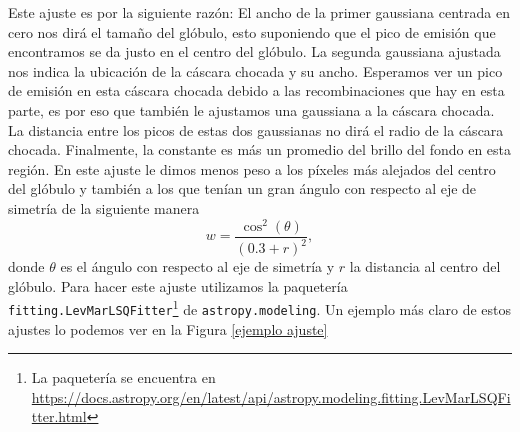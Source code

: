 \documentclass{book}
\begin{document}
Este ajuste es por la siguiente razón: El ancho de la primer gaussiana
centrada en cero nos dirá el tamaño del glóbulo, esto suponiendo que
el pico de emisión que encontramos se da justo en el centro del
glóbulo. La segunda gaussiana ajustada nos indica la ubicación de la
cáscara chocada y su ancho. Esperamos ver un pico de emisión en esta
cáscara chocada debido a las recombinaciones que hay en esta parte, es
por eso que también le ajustamos una gaussiana a la cáscara chocada.
La distancia entre los picos de estas dos gaussianas no dirá el radio
de la cáscara chocada. Finalmente, la constante es más un promedio del
brillo del fondo en esta región. En este ajuste le dimos menos peso a
los píxeles más alejados del centro del glóbulo y también a los que
tenían un gran ángulo con respecto al eje de simetría de la siguiente
manera
\begin{equation}\label{eq: peso}
    w = \frac{\cos^2(\theta)}{(0.3+r)^2},
\end{equation}
donde $\theta$ es el ángulo con respecto al eje de simetría y $r$ la
distancia al centro del glóbulo. Para hacer este ajuste utilizamos la
paquetería \verb|fitting.LevMarLSQFitter|\footnote{La paquetería se
  encuentra en
  \url{https://docs.astropy.org/en/latest/api/astropy.modeling.fitting.LevMarLSQFitter.html}}
de \verb|astropy.modeling|. Un ejemplo más claro de estos ajustes lo
podemos ver en la Figura \ref{ejemplo ajuste}
\end{document}
